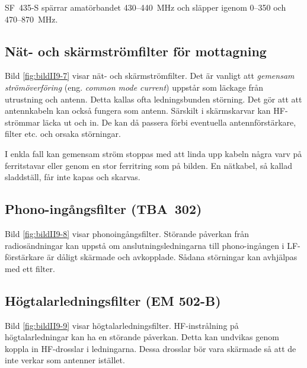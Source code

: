 SF~435-S spärrar amatörbandet 430--440~MHz och släpper igenom
0--350 och 470--870~MHz.

\subsection{Nät- och skärmströmfilter för mottagning}


Bild \ref{fig:bildII9-7} visar nät- och skärmströmfilter.
Det är vanligt att \emph{gemensam strömöverföring} (eng.
\emph{common mode current}) uppstår som läckage från utrustning och antenn.
Detta kallas ofta ledningsbunden störning.
Det gör att att antennkabeln kan också fungera som antenn.
Särskilt i skärmskarvar kan HF-strömmar läcka ut och in.
De kan då passera förbi eventuella antennförstärkare, filter etc. och orsaka
störningar.

I enkla fall kan gemensam ström stoppas med att linda upp kabeln några varv på
ferritstavar eller genom en stor ferritring som på bilden.
En nätkabel, så kallad sladdställ, får inte kapas och skarvas.

\subsection{Phono-ingångsfilter (TBA~302)}



Bild \ref{fig:bildII9-8} visar phonoingångsfilter.
Störande påverkan från radiosändningar kan uppstå om anslutningsledningarna
till phono-ingången i LF-förstärkare är dåligt skärmade och avkopplade.
Sådana störningar kan avhjälpas med ett filter.

\subsection{Högtalarledningsfilter (EM 502-B)}

Bild \ref{fig:bildII9-9} visar högtalarledningsfilter.
HF-instrålning på högtalarledningar kan ha en störande påverkan.
Detta kan undvikas genom koppla in HF-drosslar i ledningarna.
Dessa drosslar bör vara skärmade så att de inte verkar som antenner istället.

